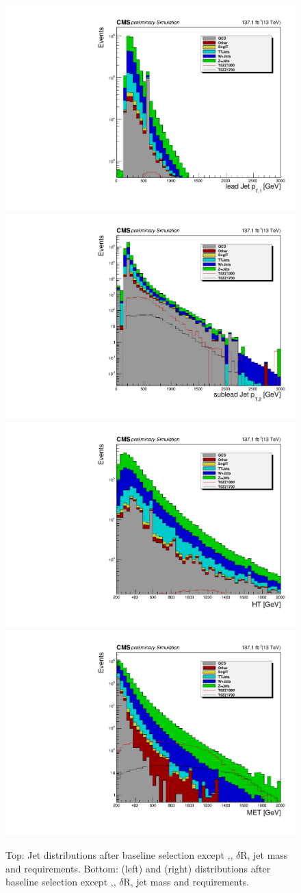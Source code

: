 \begin{figure}[htbp!]
  \centering
  \includegraphics[width=0.48\linewidth]{plots/event-selection/2017JetPt1scaled137_baseline.pdf}
  \includegraphics[width=0.48\linewidth]{plots/event-selection/2017JetPt2scaled137_baseline.pdf}\\[1mm]
  \includegraphics[width=0.48\linewidth]{plots/event-selection/2017HTscaled137_baseline.pdf}
  \includegraphics[width=0.48\linewidth]{plots/event-selection/2017METscaled137_baseline.pdf}\\[1mm]
  \caption{
     Top: Jet \pt distributions after baseline selection except \HT,\MET, $\delta$R, jet mass and \pt requirements.
     Bottom:  \HT(left) and \MET(right) distributions after  baseline selection except \HT,\MET, $\delta$R, jet mass and \pt requirements.
  }
  \label{fig:cutFlow}
\end{figure}

